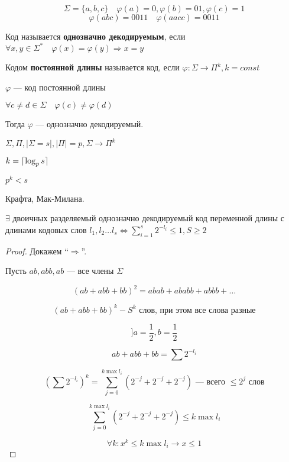 \begin{example}
    $$\Sigma=\{a,b,c\} \quad \varphi(a)=0, \varphi(b)=01, \varphi(c)=1$$
    $$\varphi(abc)=0011 \quad \varphi(aacc)=0011$$
\end{example}

\begin{definition}
    Код называется \textbf{однозначно декодируемым}, если $\forall x,y\in\Sigma^* \quad \varphi(x)=\varphi(y) \Rightarrow x=y$
\end{definition}

\begin{definition}
    Кодом \textbf{постоянной длины} называется код, если $\varphi: \Sigma\to\Pi^k, k=const$
\end{definition}

\begin{lemma}
    $\varphi$ --- код постоянной длины

    $\forall c\not=d\in\Sigma \quad \varphi(c)\not=\varphi(d)$

    Тогда $\varphi$ --- однозначно декодируемый.
\end{lemma}

\begin{theorem}
    $\Sigma, \Pi, |\Sigma=s|, |\Pi|=p, \Sigma\to \Pi^k$

    $k=\lceil\log_p s\rceil$

    $p^k<s$
\end{theorem}

\begin{theorem}
    Крафта, Мак-Милана.

    $\exists$ двоичных разделяемый однозначно декодируемый код переменной длины с длинами кодовых слов $l_1,l_2\ldots l_s\Leftrightarrow\sum_{i=1}^s 2^{-l_i}\leq 1, S\geq 2$
\end{theorem}

\begin{proof}
    Докажем ``$\Rightarrow$''.

    Пусть $ab, abb, ab$ --- все члены $\Sigma$

    $$(ab+abb+bb)^2=abab+ababb+abbb+\ldots$$

    $$(ab+abb+bb)^k - S^k \text{ слов, при этом все слова разные} $$

    $$]a=\frac{1}{2}, b=\frac{1}{2}$$

    $$ab+abb+bb=\sum 2^{-l_i}$$

    $$(\sum 2^{-l_i})^k=\sum_{j=0}^{k\max l_i}(2^{-j}+2^{-j}+2^{-j}) \text{ --- всего $\leq 2^j$ слов}$$

    $$\sum_{j=0}^{k\max l_i}(2^{-j}+2^{-j}+2^{-j})\leq k\max l_i$$

    $$\forall k: x^k\leq k\max l_i \to x\leq 1$$
\end{proof}

